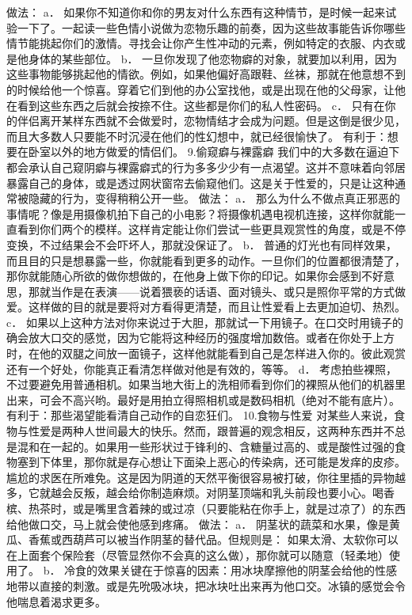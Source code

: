 \documentclass[12pt,UTF8,openany]{ctexbook}
\begin{document}
做法：
a． 如果你不知道你和你的男友对什么东西有这种情节，是时候一起来试验一下了。一起读一些色情小说做为恋物乐趣的前奏，因为这些故事能告诉你哪些情节能挑起你们的激情。寻找会让你产生性冲动的元素，例如特定的衣服、内衣或是他身体的某些部位。
b． 一旦你发现了他恋物癖的对象，就要加以利用，因为这些事物能够挑起他的情欲。例如，如果他偏好高跟鞋、丝袜，那就在他意想不到的时候给他一个惊喜。穿着它们到他的办公室找他，或是出现在他的父母家，让他在看到这些东西之后就会按捺不住。这些都是你们的私人性密码。
c． 只有在你的伴侣离开某样东西就不会做爱时，恋物情结才会成为问题。但是这倒是很少见，而且大多数人只要能不时沉浸在他们的性幻想中，就已经很愉快了。
有利于：想要在卧室以外的地方做爱的情侣们。
9.偷窥癖与裸露癖
我们中的大多数在逼迫下都会承认自己窥阴癖与裸露癖式的行为多多少少有一点渴望。这并不意味着向邻居暴露自己的身体，或是透过网状窗帘去偷窥他们。这是关于性爱的，只是让这种通常被隐藏的行为，变得稍稍公开一些。
做法：
a． 那么为什么不做点真正邪恶的事情呢？像是用摄像机拍下自己的小电影？将摄像机遇电视机连接，这样你就能一直看到你们两个的模样。这样肯定能让你们尝试一些更具观赏性的角度，或是不停变换，不过结果会不会吓坏人，那就没保证了。
b． 普通的灯光也有同样效果，而且目的只是想暴露一些，你就能看到更多的动作。一旦你们的位置都很清楚了，那你就能随心所欲的做你想做的，在他身上做下你的印记。如果你会感到不好意思，那就当作是在表演——说着猥亵的话语、面对镜头、或只是照你平常的方式做爱。这样做的目的就是要将对方看得更清楚，而且让性爱看上去更加迫切、热烈。
c． 如果以上这种方法对你来说过于大胆，那就试一下用镜子。在口交时用镜子的确会放大口交的感觉，因为它能将这种经历的强度增加数倍。或者在你处于上方时，在他的双腿之间放一面镜子，这样他就能看到自己是怎样进入你的。彼此观赏还有一个好处，你能真正看清怎样做对他是有效的，等等。
d． 考虑拍些裸照，不过要避免用普通相机。如果当地大街上的洗相师看到你们的裸照从他们的机器里出来，可会不高兴哟。最好是用拍立得照相机或是数码相机（绝对不能有底片）。
有利于：那些渴望能看清自己动作的自恋狂们。
10.食物与性爱
对某些人来说，食物与性爱是两种人世间最大的快乐。然而，跟普遍的观念相反，这两种东西并不总是混和在一起的。如果用一些形状过于锋利的、含糖量过高的、或是酸性过强的食物塞到下体里，那你就是存心想让下面染上恶心的传染病，还可能是发痒的皮疹。尴尬的求医在所难免。这是因为阴道的天然平衡很容易被打破，你往里插的异物越多，它就越会反叛，越会给你制造麻烦。对阴茎顶端和乳头前段也要小心。喝香槟、热茶时，或是嘴里含着辣的或过凉（只要能粘在你手上，就是过凉了）的东西给他做口交，马上就会使他感到疼痛。
做法：
a． 阴茎状的蔬菜和水果，像是黄瓜、香蕉或西葫芦可以被当作阴茎的替代品。但规则是： 如果太滑、太软你可以在上面套个保险套（尽管显然你不会真的这么做），那你就可以随意（轻柔地）使用了。
b． 冷食的效果关键在于惊喜的因素：用冰块摩擦他的阴茎会给他的性感地带以直接的刺激。或是先吮吸冰块，把冰块吐出来再为他口交。冰镇的感觉会令他喘息着渴求更多。
\end{document}
